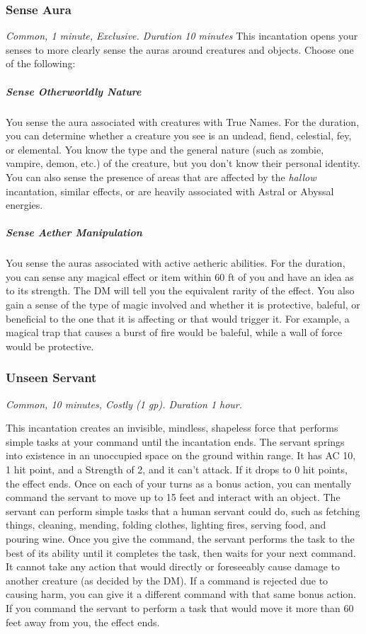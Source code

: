 \subsubsection{Sense Aura}
\textit{Common, 1 minute, Exclusive. Duration 10 minutes}
This incantation opens your senses to more clearly sense the auras around creatures and objects. Choose one of the following:

\subparagraph*{Sense Otherworldly Nature} You sense the aura associated with creatures with True Names. For the duration, you can determine whether a creature you see is an undead, fiend, celestial, fey, or elemental. You know the type and the general nature (such as zombie, vampire, demon, etc.) of the creature, but you don't know their personal identity. You can also sense the presence of areas that are affected by the \textit{hallow} incantation, similar effects, or are heavily associated with Astral or Abyssal energies.

\subparagraph*{Sense Aether Manipulation} You sense the auras associated with active aetheric abilities. For the duration, you can sense any magical effect or item within 60 ft of you and have an idea as to its strength. The DM will tell you the equivalent rarity of the effect. You also gain a sense of the type of magic involved and whether it is protective, baleful, or beneficial to the one that it is affecting or that would trigger it. For example, a magical trap that causes a burst of fire would be baleful, while a wall of force would be protective.

\subsubsection{Unseen Servant}
\textit{Common, 10 minutes, Costly (1 gp). Duration 1 hour.}

This incantation creates an invisible, mindless, shapeless force that performs simple tasks at your command until the incantation ends. The servant springs into existence in an unoccupied space on the ground within range. It has AC 10, 1 hit point, and a Strength of 2, and it can't attack. If it drops to 0 hit points, the effect ends.
Once on each of your turns as a bonus action, you can mentally command the servant to move up to 15 feet and interact with an object. The servant can perform simple tasks that a human servant could do, such as fetching things, cleaning, mending, folding clothes, lighting fires, serving food, and pouring wine. Once you give the command, the servant performs the task to the best of its ability until it completes the task, then waits for your next command. It cannot take any action that would directly or foreseeably cause damage to another creature (as decided by the DM). If a command is rejected due to causing harm, you can give it a different command with that same bonus action.
If you command the servant to perform a task that would move it more than 60 feet away from you, the effect ends.

